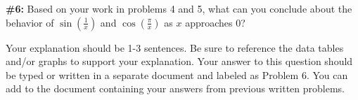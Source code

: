 \documentclass[handout,nooutcomes]{ximera}
\begin{document}
\begin{problem}{\textbf{\#6:}}
Based on your work in problems 4 and 5, what can you conclude about the behavior of $\sin\left(\frac{1}{x}\right)$ and $\cos\left(\frac{\pi}{x}\right)$ as $x$ approaches 0?

Your explanation should be 1-3 sentences. Be sure to reference the data tables and/or graphs to support your explanation. Your answer to this question should be typed or written in a separate document and labeled as Problem 6. You can add to the document containing your answers from previous written problems.

\end{problem}
\end{document}
